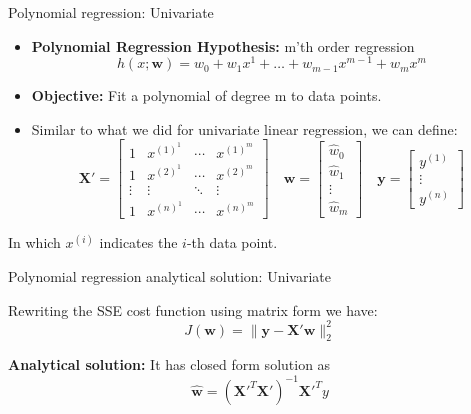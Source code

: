 \documentclass[serif, aspectratio=169]{beamer}
\begin{document}
\begin{frame}{Polynomial regression: Univariate}
    \begin{itemize}
        \item \textbf{Polynomial Regression Hypothesis:} m'th order regression
        \[
        h(x; \mathbf{w}) = w_0 + w_1 x^1 + \dots + w_{m-1} x^{m-1} + w_m x^m
        \]
        \item \textbf{Objective:} Fit a polynomial of degree m to data points.
    \end{itemize}

    \begin{itemize}
        \item Similar to what we did for univariate linear regression, we can define:
        \[
        \mathbf{X'} =
        \begin{bmatrix}
        1 & x^{(1)^1} & \cdots & x^{(1)^m} \\
        1 & x^{(2)^1} & \cdots & x^{(2)^m} \\
        \vdots & \vdots & \ddots & \vdots \\
        1 & x^{(n)^1} & \cdots & x^{(n)^m}
        \end{bmatrix}
        \quad
        \mathbf{w} =
        \begin{bmatrix}
        \hat{w}_0 \\
        \hat{w}_1 \\
        \vdots \\
        \hat{w}_m
        \end{bmatrix}
        \quad
        \mathbf{y} =
        \begin{bmatrix}
        y^{(1)} \\
        \vdots \\
        y^{(n)}
        \end{bmatrix}
        \]
    \end{itemize}
    \begin{center}
        In which \( x^{(i)} \) indicates the \( i \)-th data point.
    \end{center}
\end{frame}

\begin{frame}{Polynomial regression analytical solution: Univariate}
    \item Rewriting the SSE cost function using matrix form we have:
    \[
    J(\mathbf{w}) = \| \mathbf{y} - \mathbf{X'} \mathbf{w} \|_2^2
    \]
    \item \textbf{Analytical solution:} It has closed form solution as $$ \hat{\mathbf{w}} = \left( \mathbf{X'}^T\mathbf{X'} \right)^{-1} \mathbf{X'}^T y $$
\end{frame}
\end{document}
